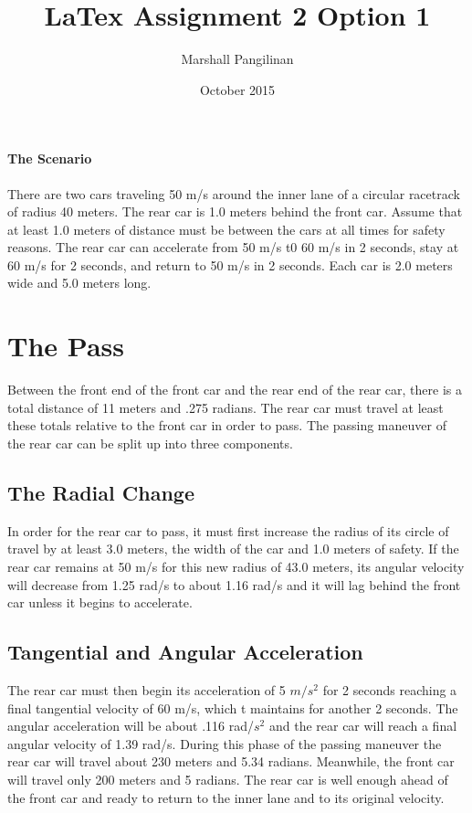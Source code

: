 \documentclass{article}
\title{LaTex Assignment 2 Option 1}
\author{Marshall Pangilinan}
\date{October 2015}
\begin{document}
\maketitle
\newpage
\paragraph{The Scenario} There are two cars traveling 50 m/s around the inner lane of a circular racetrack of radius 40 meters. The rear car is 1.0 meters behind the front car. Assume that at least 1.0 meters of distance must be between the cars at all times for safety reasons. The rear car can accelerate from 50 m/s t0 60 m/s in 2 seconds, stay at 60 m/s for 2 seconds, and return to 50 m/s in 2 seconds. Each car is 2.0 meters wide and 5.0 meters long.

\section{The Pass}
Between the front end of the front car and the rear end of the rear car, there is a total distance of 11 meters and .275 radians. The rear car must travel at least these totals relative to the front car in order to pass. The passing maneuver of the rear car can be split up into three components.
\subsection{The Radial Change}
In order for the rear car to pass, it must first increase the radius of its circle of travel by at least 3.0 meters, the width of the car and 1.0 meters of safety. If the rear car remains at 50 m/s for this new radius of 43.0 meters, its angular velocity will decrease from 1.25 rad/s to about 1.16 rad/s and it will lag behind the front car unless it begins to accelerate.
\subsection{Tangential and Angular Acceleration}
The rear car must then begin its acceleration of 5 ${m}/{s^2}$ for 2 seconds reaching a final tangential velocity of 60 m/s, which t maintains for another 2 seconds. The angular acceleration will be about .116 rad/${s^2}$ and the rear car will reach a final angular velocity of 1.39 rad/s. During this phase of the passing maneuver the rear car will travel about 230 meters and 5.34 radians. Meanwhile, the front car will travel only 200 meters and 5 radians. The rear car is well enough ahead of the front car and ready to return to the inner lane and to its original velocity.
\end{document}
